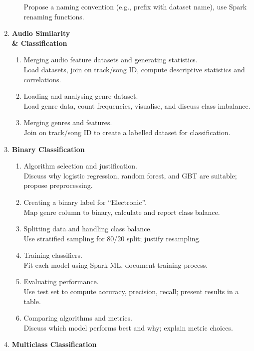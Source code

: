 \documentclass{article}
\begin{document}
\begin{enumerate}
\begin{enumerate}
      Propose a naming convention (e.g., prefix with dataset name), use Spark renaming functions.
    \end{enumerate}
  \item \textbf{Audio Similarity \\& Classification}
    \begin{enumerate}
      \item Merging audio feature datasets and generating statistics.\\
      Load datasets, join on track/song ID, compute descriptive statistics and correlations.
      \item Loading and analysing genre dataset.\\
      Load genre data, count frequencies, visualise, and discuss class imbalance.
      \item Merging genres and features.\\
      Join on track/song ID to create a labelled dataset for classification.
    \end{enumerate}
  \item \textbf{Binary Classification}
    \begin{enumerate}
      \item Algorithm selection and justification.\\
      Discuss why logistic regression, random forest, and GBT are suitable; propose preprocessing.
      \item Creating a binary label for ``Electronic''.\\
      Map genre column to binary, calculate and report class balance.
      \item Splitting data and handling class balance.\\
      Use stratified sampling for 80/20 split; justify resampling.
      \item Training classifiers.\\
      Fit each model using Spark ML, document training process.
      \item Evaluating performance.\\
      Use test set to compute accuracy, precision, recall; present results in a table.
      \item Comparing algorithms and metrics.\\
      Discuss which model performs best and why; explain metric choices.
    \end{enumerate}
  \item \textbf{Multiclass Classification}
    \begin{enumerate}

\end{enumerate}
\end{enumerate}
\end{document}

